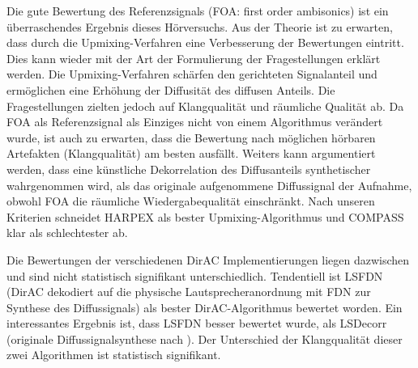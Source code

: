 Die gute Bewertung des Referenzsignals (FOA: first order ambisonics) ist ein überraschendes Ergebnis dieses Hörversuchs. Aus der Theorie ist zu erwarten, dass durch die Upmixing-Verfahren eine Verbesserung der Bewertungen eintritt.
Dies kann wieder mit der Art der Formulierung der Fragestellungen erklärt werden.
Die Upmixing-Verfahren schärfen den gerichteten Signalanteil und ermöglichen eine Erhöhung der Diffusität des diffusen Anteils.
Die Fragestellungen zielten jedoch auf Klangqualität und räumliche Qualität ab.
Da FOA als Referenzsignal als Einziges nicht von einem Algorithmus verändert wurde, ist auch zu erwarten, dass die Bewertung nach möglichen hörbaren Artefakten (Klangqualität) am besten ausfällt.
Weiters kann argumentiert werden, dass eine künstliche Dekorrelation des Diffusanteils synthetischer wahrgenommen wird, als das originale aufgenommene Diffussignal der Aufnahme, obwohl FOA die räumliche Wiedergabequalität einschränkt.
Nach unseren Kriterien schneidet HARPEX als bester Upmixing-Algorithmus und COMPASS klar als schlechtester ab.

Die Bewertungen der verschiedenen DirAC Implementierungen liegen dazwischen und sind nicht statistisch signifikant unterschiedlich.
Tendentiell ist LSFDN (DirAC dekodiert auf die physische Lautsprecheranordnung mit FDN zur Synthese des Diffussignals) als bester DirAC-Algorithmus bewertet worden.
Ein interessantes Ergebnis ist, dass LSFDN besser bewertet wurde, als LSDecorr (originale Diffussignalsynthese nach \cite{pulkki}).
Der Unterschied der Klangqualität dieser zwei Algorithmen ist statistisch signifikant.
